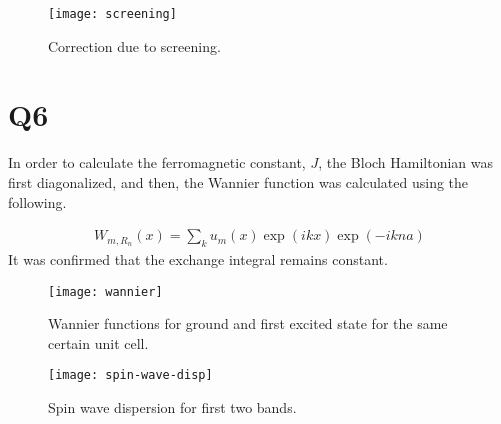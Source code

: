 \documentclass[]{report}
\begin{document}
\begin{figure}[h!]
	\centering
	\texttt{[image: screening]}
	\caption{Correction due to screening.}
	\label{fig:screening}
\end{figure}

\section{Q6}
In order to calculate the ferromagnetic constant, $J$, the Bloch Hamiltonian was first diagonalized, and then, the Wannier function was calculated using the following.

\begin{align}
W_{m,R_n}(x) = \sum_k u_{m}(x)\exp(i k x) \exp(-i k n a)
\end{align}
It was confirmed that the exchange integral remains constant.

\begin{figure}[h!]
	\centering
	\texttt{[image: wannier]}
	\caption{Wannier functions for ground and first excited state for the same certain unit cell.}
	\label{fig:wannier}
\end{figure}

\begin{figure}[h!]
	\centering
	\texttt{[image: spin-wave-disp]}
	\caption{Spin wave dispersion for first two bands.}
	\label{fig:spin-wave-disp}
\end{figure}
\end{document}
